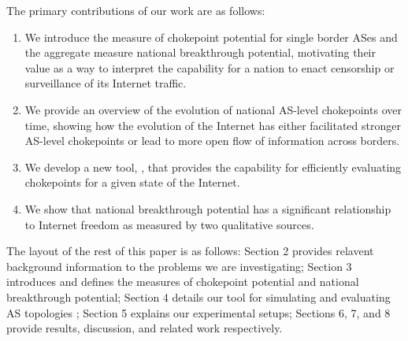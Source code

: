 \par
The primary contributions of our work are as follows: 
\begin{enumerate}
 \item We introduce the measure of chokepoint potential for single border ASes and the 
 aggregate measure national breakthrough potential, 
motivating their value as a way to interpret the capability for a 
nation to enact censorship or surveillance of its Internet traffic.
 \item We provide an overview of the evolution of national AS-level chokepoints over time, 
 showing how the evolution of the Internet has either facilitated stronger
 AS-level chokepoints or lead to more open flow of information across borders.
 \item We develop a new tool, \toolname{}, that provides the capability for
efficiently evaluating chokepoints for a given state of the Internet. 
 \item We show that national breakthrough potential
has a significant relationship to Internet freedom as measured by two qualitative sources.
\end{enumerate}


\par
The layout of the rest of this paper is as follows: Section 2 provides relavent background information
to the problems we are investigating; Section 3 introduces and defines the measures of chokepoint
potential and national breakthrough potential; Section 4 details our tool for simulating and evaluating 
AS topologies \toolname{}; Section 5
explains our experimental setups; Sections 6, 7, and 8 provide results, discussion, and related work
respectively.
